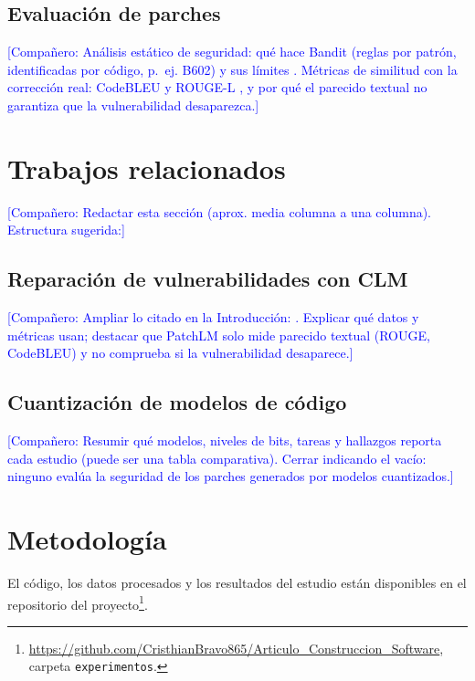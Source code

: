 \documentclass[conference]{IEEEtran}
\newcommand{\comp}[1]{\textcolor{blue}{[Compañero: #1]}}
\begin{document}
\subsection{Evaluación de parches}
\comp{Análisis estático de seguridad: qué hace Bandit (reglas por patrón, identificadas por código, p.~ej. B602) y sus límites \cite{pycqa2026bandit}. Métricas de similitud con la corrección real: CodeBLEU \cite{ren2020codebleu} y ROUGE-L \cite{lin2004rouge}, y por qué el parecido textual no garantiza que la vulnerabilidad desaparezca.}

\section{Trabajos relacionados}\label{sec:trabajos}

\comp{Redactar esta sección (aprox. media columna a una columna). Estructura sugerida:}

\subsection{Reparación de vulnerabilidades con CLM}
\comp{Ampliar lo citado en la Introducción: \cite{wu2023effective,zhang2023pretrained,zhou2025llmvuln,bhandari2025patchlm}. Explicar qué datos y métricas usan; destacar que PatchLM solo mide parecido textual (ROUGE, CodeBLEU) y no comprueba si la vulnerabilidad desaparece.}

\subsection{Cuantización de modelos de código}
\comp{Resumir qué modelos, niveles de bits, tareas y hallazgos reporta cada estudio \cite{giagnorio2025quantizing,vallecillos2026smaller,kusama2025small,haque2025secure} (puede ser una tabla comparativa). Cerrar indicando el vacío: ninguno evalúa la seguridad de los parches generados por modelos cuantizados.}

\section{Metodología}\label{sec:metodo}

El código, los datos procesados y los resultados del estudio están disponibles en el repositorio del proyecto\footnote{\url{https://github.com/CristhianBravo865/Articulo_Construccion_Software}, carpeta \texttt{experimentos}.}.
\end{document}
